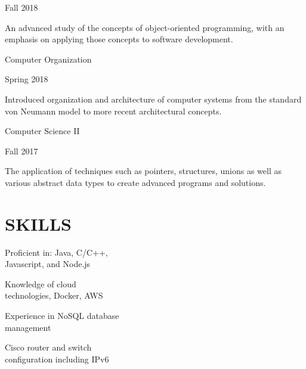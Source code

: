 \documentclass{article}
\newenvironment{heading} {
    \bfseries
    \normalsize
    \color{black}
    \setlength{\parskip}{1em}
    \renewcommand{\familydefault}{merriweather}
} {\par}
\newenvironment{subtext} {
    \footnotesize
    \color{Dark-Grey}
    \setlength{\parskip}{0.75em}
    \renewcommand{\familydefault}{opensans}
} {\par}
\newenvironment{ntext} {
    \small
    \color{Dark-Grey}
    \setlength{\parskip}{0.75em}
    \renewcommand{\familydefault}{merriweather}
} {\par}
\begin{document}
\begin{multicols}{2}
    \begin{subtext}
        Fall 2018
    \end{subtext}

    \begin{ntext}
        An advanced study of the concepts of object-oriented programming, with an emphasis on applying those concepts to software development.
    \end{ntext}

    \begin{heading}
       Computer Organization
    \end{heading}

    \begin{subtext}
        Spring 2018
    \end{subtext}

    \begin{ntext}
        Introduced organization and architecture of computer systems from the standard von Neumann model to more recent architectural concepts.
    \end{ntext}

    \begin{heading}
        Computer Science II
    \end{heading}

    \begin{subtext}
        Fall 2017
    \end{subtext}

    \begin{ntext}
        The application of techniques such as pointers, structures, unions as well as various abstract data types to create advanced programs and solutions.
    \end{ntext}

\columnbreak
\section*{SKILLS}

    \begin{ntext}
        Proficient in: Java, C/C++, \\
        Javascript, and Node.js

        Knowledge of cloud \\
        technologies, Docker, AWS

        Experience in NoSQL database \\
        management

        Cisco router and switch \\
        configuration including IPv6
    \end{ntext}


\end{multicols}
\end{document}
